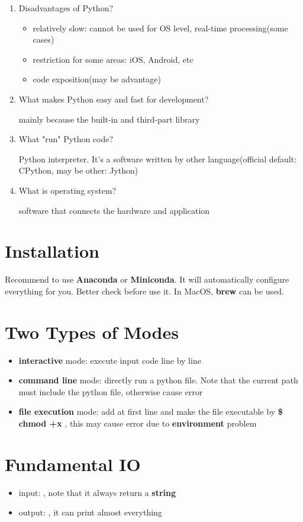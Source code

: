 \documentclass[10pt,a4paper,oneside]{article}
\begin{document}
\begin{enumerate}
	\item Disadvantages of Python?
	\begin{itemize}
		\item relatively slow: cannot be used for OS level, real-time processing(some cases)
		\item restriction for some areas: iOS, Android, etc
		\item code exposition(may be advantage)
	\end{itemize}

	\item What makes Python easy and fast for development?
	
	mainly because the built-in and third-part library
	
	\item What "run" Python code?
	
	Python interpreter. It's a software written by other language(official default: CPython, may be other: Jython)
	
	\item What is operating system?
	
	software that connects the hardware and application
\end{enumerate}

\section{Installation}
Recommend to use \textbf{Anaconda} or \textbf{Miniconda}. It will automatically configure everything for you. Better check before use it. In MacOS, \textbf{brew} can be used.

\section{Two Types of Modes}
\begin{itemize}
	\item \textbf{interactive} mode: execute input code line by line
	\item \textbf{command line} mode: directly run a python file. Note that the current path must include the python file, otherwise cause error
	\item \textbf{file execution} mode: add  at first line and make the file executable by \textbf{\$ chmod +x }, this may cause error due to \textbf{environment} problem
\end{itemize}

\section{Fundamental IO}
\begin{itemize}
	\item input: , note that it always return a \textbf{string}
	\item output: , it can print almost everything
\end{itemize}
\end{document}

